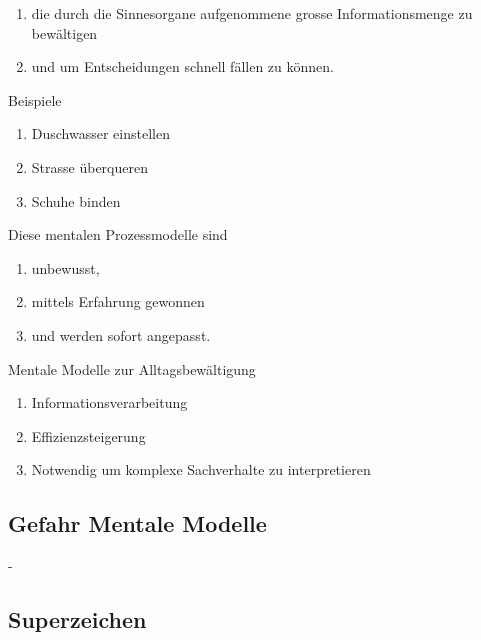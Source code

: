 \documentclass[
	final,
	a4paper,
	oneside,
	parskip=full,
	headings=standardclasses,
	headings=big,
	pointednumbers
]{scrartcl}
\begin{document}
        \begin{enumerate}[label=$\bullet$]
            \setlength{\parskip}{1mm}
            \item die durch die Sinnesorgane aufgenommene
                  grosse Informationsmenge zu bewältigen
            \item und um Entscheidungen schnell fällen zu können.
        \end{enumerate}
    
        Beispiele

        \begin{enumerate}[label=$\bullet$]
            \setlength{\parskip}{1mm}
            \item Duschwasser einstellen
            \item Strasse überqueren
            \item Schuhe binden
        \end{enumerate}

        Diese mentalen Prozessmodelle sind

        \begin{enumerate}[label=$\bullet$]
            \setlength{\parskip}{1mm}
            \item unbewusst,
            \item mittels Erfahrung gewonnen
            \item und werden sofort angepasst.
        \end{enumerate}

        Mentale Modelle zur Alltagsbewältigung

        \begin{enumerate}[label=$\bullet$]
            \setlength{\parskip}{1mm}
            \item Informationsverarbeitung
            \item Effizienzsteigerung
            \item Notwendig um komplexe Sachverhalte zu interpretieren
        \end{enumerate}

	\subsection*{Gefahr Mentale Modelle}
    
        -

	\subsection*{Superzeichen}
    
\end{document}
